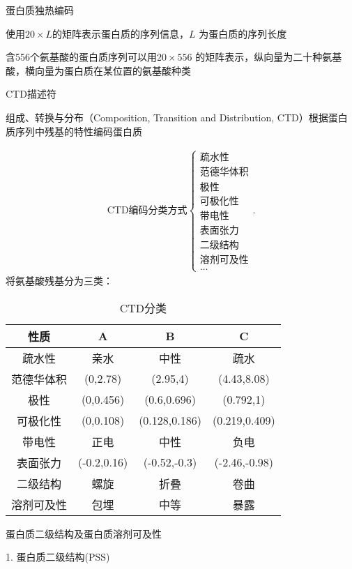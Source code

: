 \begin{notation}
    蛋白质独热编码

    使用$20\times L$的矩阵表示蛋白质的序列信息，$L$ 为蛋白质的序列长度

    \begin{eg}
        含556个氨基酸的蛋白质序列可以用$20\times 556$ 的矩阵表示，纵向量为二十种氨基酸，横向量为蛋白质在某位置的氨基酸种类
    \end{eg}
\end{notation}
\begin{notation}
    CTD描述符

    组成、转换与分布（Composition, Transition and Distribution, CTD）根据蛋白质序列中残基的特性编码蛋白质
\end{notation}
\begin{align*}
    \text{CTD编码分类方式}
    \begin{cases}
        \text{疏水性}\\
        \text{范德华体积}\\
        \text{极性}\\
        \text{可极化性}\\
        \text{带电性}\\
        \text{表面张力}\\
        \text{二级结构}\\
        \text{溶剂可及性}\\
        \ldots
    \end{cases}
.\end{align*}
\newpage
将氨基酸残基分为三类：
\begin{table}[htpb]
    \centering
    \caption{CTD分类}
    \label{tab:CTD分类}
    \begin{tabular}{|c|c|c|c|}
    \hline
    性质 & A & B & C \\
    \hline
    疏水性 & 亲水 & 中性 & 疏水\\
    范德华体积 & (0,2.78) & (2.95,4) & (4.43,8.08) \\
    极性 & (0,0.456) & (0.6,0.696) & (0.792,1) \\
    可极化性 &  (0,0.108) & (0.128,0.186) & (0.219,0.409) \\
    带电性 & 正电 & 中性 & 负电 \\
    表面张力 & (-0.2,0.16) & (-0.52,-0.3) & (-2.46,-0.98) \\
    二级结构 & 螺旋 & 折叠 & 卷曲\\
    溶剂可及性 & 包埋 & 中等 & 暴露\\
    \hline
    \end{tabular}
\end{table}

\begin{notation}
    蛋白质二级结构及蛋白质溶剂可及性

    1. 蛋白质二级结构(PSS)
\end{notation}

